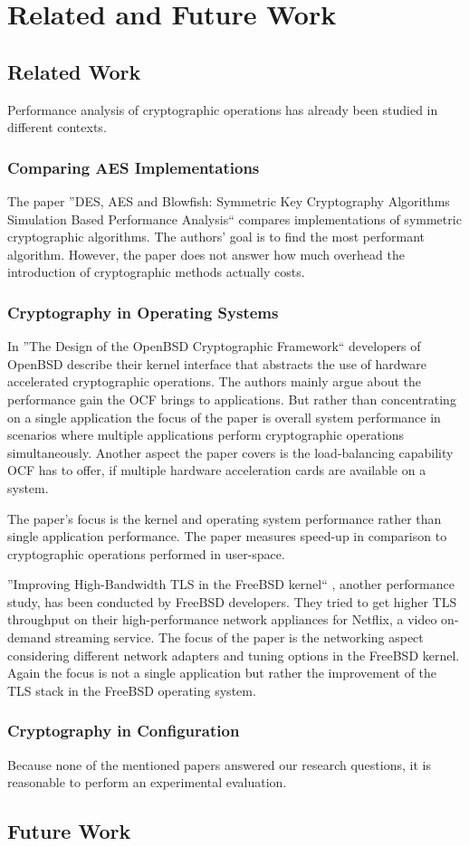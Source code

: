 \chapter{Related and Future Work}

\section{Related Work}\label{relatedwork}

Performance analysis of cryptographic operations has already been studied in different contexts.

	\subsection{Comparing AES Implementations}

The paper ''DES, AES and Blowfish: Symmetric Key Cryptography Algorithms Simulation Based Performance Analysis`` \cite{thakur2011aes} compares implementations of symmetric cryptographic algorithms.
The authors' goal is to find the most performant algorithm.
However, the paper does not answer how much overhead the introduction of cryptographic methods actually costs.\cite{thakur2011aes}

	\subsection{Cryptography in Operating Systems}

In ''The Design of the OpenBSD Cryptographic Framework`` \cite{ocf} developers of OpenBSD describe their kernel interface that abstracts the use of hardware accelerated cryptographic operations.
The authors mainly argue about the performance gain the OCF brings to applications.
But rather than concentrating on a single application the focus of the paper is overall system performance in scenarios where multiple applications perform cryptographic operations simultaneously.
Another aspect the paper covers is the load-balancing capability OCF has to offer, if multiple hardware acceleration cards are available on a system.

The paper's focus is the kernel and operating system performance rather than single application performance.
The paper measures speed-up in comparison to cryptographic operations performed in user-space.\cite{ocf}

''Improving High-Bandwidth TLS in the FreeBSD kernel`` \cite{freebsdtls}, another performance study, has been conducted by FreeBSD developers.
They tried to get higher TLS throughput on their high-performance network appliances for Netflix, a video on-demand streaming service.
The focus of the paper is the networking aspect considering different network adapters and tuning options in the FreeBSD kernel.
Again the focus is not a single application but rather the improvement of the TLS stack in the FreeBSD operating system.\cite{freebsdtls}

	\subsection{Cryptography in Configuration}

Because none of the mentioned papers answered our research questions, it is reasonable to perform an experimental evaluation.

\section{Future Work}

